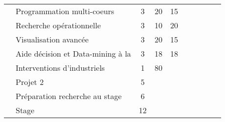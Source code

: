 \begin{tabular}{c|m{6cm}|cm{1cm}|cm{1cm}|cm{1cm}|cm{1cm}|}
 & \color{black} \mbox{Programmation} \mbox{multi-coeurs}  & \color{black} 3 & \color{black} 20 & \color{black} 15 & \color{black}  \\ \cline{2-6}
 & \cellcolor{couleurClaire} \color{couleurTexte} \mbox{Recherche} \mbox{opérationnelle}  & \cellcolor{couleurClaire} \color{couleurTexte} 3 & \cellcolor{couleurClaire} \color{couleurTexte} 10 & \cellcolor{couleurClaire} \color{couleurTexte} 20 & \cellcolor{couleurClaire} \color{couleurTexte}  \\ \cline{2-6}
 & \color{black} \mbox{Visualisation} \mbox{avancée}  & \color{black} 3 & \color{black} 20 & \color{black} 15 & \color{black}  \\ \cline{2-6}
 & \cellcolor{couleurClaire} \color{couleurTexte} \mbox{Aide} \mbox{décision} \mbox{et} \mbox{Data-mining} \mbox{à} \mbox{la}  & \cellcolor{couleurClaire} \color{couleurTexte} 3 & \cellcolor{couleurClaire} \color{couleurTexte} 18 & \cellcolor{couleurClaire} \color{couleurTexte} 18 & \cellcolor{couleurClaire} \color{couleurTexte}  \\ \cline{2-6}
 & \color{black} \mbox{Interventions} \mbox{d'industriels}  & \color{black} 1 & \color{black} 80 & \color{black}  & \color{black}  \\ \cline{2-6}
 & \cellcolor{couleurClaire} \color{couleurTexte} \mbox{Projet} \mbox{2}  & \cellcolor{couleurClaire} \color{couleurTexte} 5 & \cellcolor{couleurClaire} \color{couleurTexte}  & \cellcolor{couleurClaire} \color{couleurTexte}  & \cellcolor{couleurClaire} \color{couleurTexte}  \\ \cline{2-6}
 & \color{black} \mbox{Préparation} \mbox{recherche} \mbox{au} \mbox{stage}  & \color{black} 6 & \color{black}  & \color{black}  & \color{black}  \\ \cline{2-6}
 & \cellcolor{couleurClaire} \color{couleurTexte} \mbox{Stage}  & \cellcolor{couleurClaire} \color{couleurTexte} 12 & \cellcolor{couleurClaire} \color{couleurTexte}  & \cellcolor{couleurClaire} \color{couleurTexte}  & \cellcolor{couleurClaire} \color{couleurTexte}  \\ \cline{2-6}
\hline
\end{tabular}
